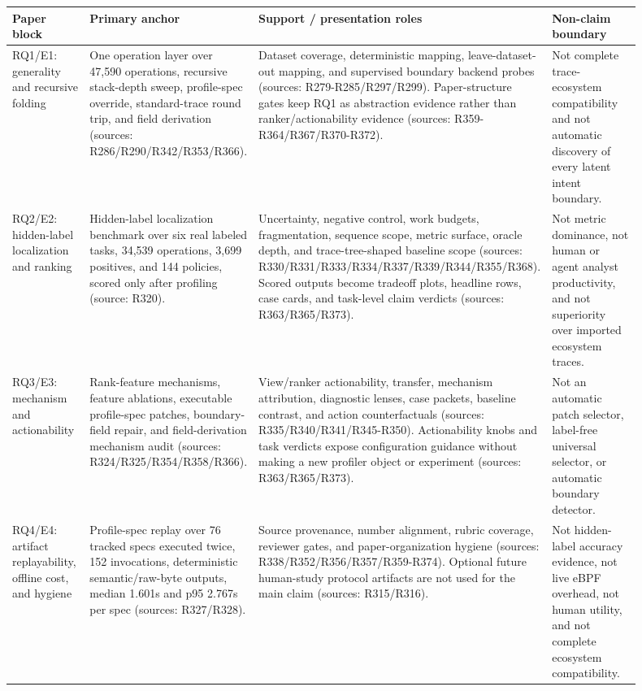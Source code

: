 \begin{tabular}{p{0.14\linewidth}p{0.26\linewidth}p{0.28\linewidth}p{0.22\linewidth}}
\toprule
Paper block & Primary anchor & Support / presentation roles & Non-claim boundary \\
\midrule
RQ1/E1: generality and recursive folding & One operation layer over 47,590 operations, recursive stack-depth sweep, profile-spec override, standard-trace round trip, and field derivation (sources: R286/R290/R342/R353/R366). & Dataset coverage, deterministic mapping, leave-dataset-out mapping, and supervised boundary backend probes (sources: R279-R285/R297/R299). Paper-structure gates keep RQ1 as abstraction evidence rather than ranker/actionability evidence (sources: R359-R364/R367/R370-R372). & Not complete trace-ecosystem compatibility and not automatic discovery of every latent intent boundary. \\
RQ2/E2: hidden-label localization and ranking & Hidden-label localization benchmark over six real labeled tasks, 34,539 operations, 3,699 positives, and 144 policies, scored only after profiling (source: R320). & Uncertainty, negative control, work budgets, fragmentation, sequence scope, metric surface, oracle depth, and trace-tree-shaped baseline scope (sources: R330/R331/R333/R334/R337/R339/R344/R355/R368). Scored outputs become tradeoff plots, headline rows, case cards, and task-level claim verdicts (sources: R363/R365/R373). & Not metric dominance, not human or agent analyst productivity, and not superiority over imported ecosystem traces. \\
RQ3/E3: mechanism and actionability & Rank-feature mechanisms, feature ablations, executable profile-spec patches, boundary-field repair, and field-derivation mechanism audit (sources: R324/R325/R354/R358/R366). & View/ranker actionability, transfer, mechanism attribution, diagnostic lenses, case packets, baseline contrast, and action counterfactuals (sources: R335/R340/R341/R345-R350). Actionability knobs and task verdicts expose configuration guidance without making a new profiler object or experiment (sources: R363/R365/R373). & Not an automatic patch selector, label-free universal selector, or automatic boundary detector. \\
RQ4/E4: artifact replayability, offline cost, and hygiene & Profile-spec replay over 76 tracked specs executed twice, 152 invocations, deterministic semantic/raw-byte outputs, median 1.601s and p95 2.767s per spec (sources: R327/R328). & Source provenance, number alignment, rubric coverage, reviewer gates, and paper-organization hygiene (sources: R338/R352/R356/R357/R359-R374). Optional future human-study protocol artifacts are not used for the main claim (sources: R315/R316). & Not hidden-label accuracy evidence, not live eBPF overhead, not human utility, and not complete ecosystem compatibility. \\
\bottomrule
\end{tabular}
